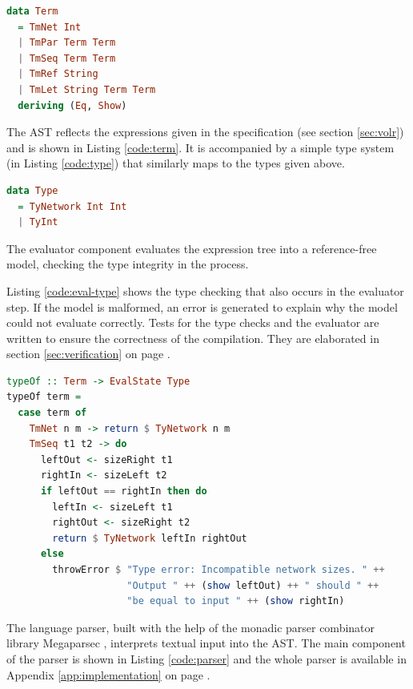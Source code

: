 \lstset{mathescape=false,showstringspaces=false}
\begin{minipage}{\linewidth}
  \begin{lstlisting}[language=haskell, caption={The Volr AST in
  Haskell},label={code:term}]
data Term
  = TmNet Int 
  | TmPar Term Term
  | TmSeq Term Term
  | TmRef String
  | TmLet String Term Term
  deriving (Eq, Show)  
\end{lstlisting}
\end{minipage}

The AST reflects the expressions given in the 
specification (see section \ref{sec:volr}) and is
shown in Listing \ref{code:term}.
It is accompanied by a simple type system (in Listing \ref{code:type})
that similarly maps to the types given above.

\begin{lstlisting}[language=haskell,label={code:type},caption={Volr type system
in Haskell}]
data Type 
  = TyNetwork Int Int
  | TyInt
\end{lstlisting}

The evaluator component evaluates the expression tree into
a reference-free model, checking the type integrity in the
process.

Listing \ref{code:eval-type} shows the type checking
that also occurs in the evaluator step. 
If the model is malformed, an error is generated to explain why the
model could not evaluate correctly.
Tests for the type checks and the evaluator are written to ensure the
correctness of the compilation.
They are elaborated in section \ref{sec:verification} on page
\pageref{sec:verification}.

\begin{lstlisting}[language=Haskell,caption={Part of the type checking code in
Haskell.},label={code:eval-type}]
typeOf :: Term -> EvalState Type
typeOf term = 
  case term of
    TmNet n m -> return $ TyNetwork n m
    TmSeq t1 t2 -> do
      leftOut <- sizeRight t1
      rightIn <- sizeLeft t2
      if leftOut == rightIn then do
        leftIn <- sizeLeft t1
        rightOut <- sizeRight t2
        return $ TyNetwork leftIn rightOut
      else
        throwError $ "Type error: Incompatible network sizes. " ++
                     "Output " ++ (show leftOut) ++ " should " ++
                     "be equal to input " ++ (show rightIn)
\end{lstlisting}

The language parser, built with the help of the monadic parser combinator library Megaparsec
\cite{megaparsec}, interprets textual input into the AST. 
The main component of the parser is shown in Listing \ref{code:parser}
and the whole parser is available in Appendix \ref{app:implementation} on page
\pageref{app:implementation_parser}.

